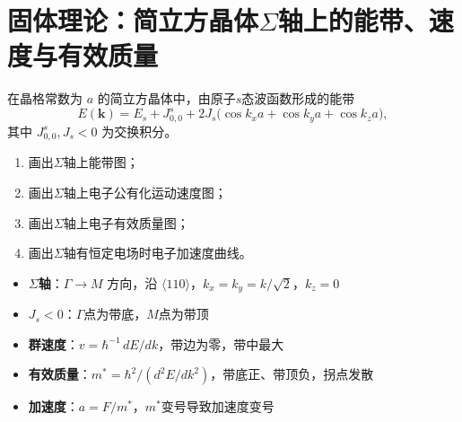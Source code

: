 \section{固体理论：简立方晶体$\Sigma$轴上的能带、速度与有效质量}
\label{sec:simple-cubic-sigma-axis}

\begin{modelbox}
在晶格常数为 $a$ 的简立方晶体中，由原子$s$态波函数形成的能带
\[
E(\bm{k})=E_s+J_{0,0}^{s}+2J_s\bigl(\cos k_xa+\cos k_ya+\cos k_za\bigr),
\]
其中 $J_{0,0}^{s},J_s<0$ 为交换积分。
\begin{enumerate}
    \item 画出$\Sigma$轴上能带图；
    \item 画出$\Sigma$轴上电子公有化运动速度图；
    \item 画出$\Sigma$轴上电子有效质量图；
    \item 画出$\Sigma$轴有恒定电场时电子加速度曲线。
\end{enumerate}
\end{modelbox}

\begin{tipbox}[考点快速分析]
\begin{itemize}
    \item \textbf{$\Sigma$轴}：$\Gamma\to M$ 方向，沿 $\langle110\rangle$，$k_x=k_y=k/\sqrt{2}$，$k_z=0$
    \item \textbf{$J_s<0$}：$\Gamma$点为带底，$M$点为带顶
    \item \textbf{群速度}：$v=\hbar^{-1}\,dE/dk$，带边为零，带中最大
    \item \textbf{有效质量}：$m^*=\hbar^2/(d^2E/dk^2)$，带底正、带顶负，拐点发散
    \item \textbf{加速度}：$a=F/m^*$，$m^*$变号导致加速度变号
\end{itemize}
\end{tipbox}

